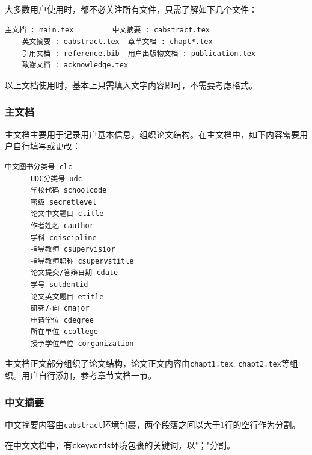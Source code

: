 大多数用户使用时，都不必关注所有文件，只需了解如下几个文件：

\begin{center}
  \begin{minipage}{0.95\textwidth}
    \begin{Verbatim}[frame=single]
    主文档 : main.tex         中文摘要 : cabstract.tex
    英文摘要 : eabstract.tex  章节文档 : chapt*.tex
    引用文档 : reference.bib  用户出版物文档 : publication.tex
    致谢文档 : acknowledge.tex
    \end{Verbatim}
  \end{minipage}
\end{center}

以上文档使用时，基本上只需填入文字内容即可，不需要考虑格式。

\subsubsection{主文档}

主文档主要用于记录用户基本信息，组织论文结构。在主文档中，如下内容需要用户自行填写或更改：

\begin{center}
  \begin{minipage}{0.65\textwidth}
    \begin{Verbatim}[frame=single]
      中文图书分类号 clc
      UDC分类号 udc
      学校代码 schoolcode
      密级 secretlevel
      论文中文题目 ctitle
      作者姓名 cauthor
      学科 cdiscipline
      指导教师 csupervisior
      指导教师职称 csupervstitle
      论文提交/答辩日期 cdate
      学号 sutdentid
      论文英文题目 etitle
      研究方向 cmajor
      申请学位 cdegree
      所在单位 ccollege
      授予学位单位 corganization
    \end{Verbatim}
  \end{minipage}
\end{center}

主文档正文部分组织了论文结构，论文正文内容由\verb |chapt1.tex|, \verb|chapt2.tex|等组织。用户自行添加，参考章节文档一节。%

\subsubsection{中文摘要}

中文摘要内容由\verb|cabstract|环境包裹，两个段落之间以大于1行的空行作为分割。

在中文文档中，有\verb|ckeywords|环境包裹的关键词，以"；"分割。

